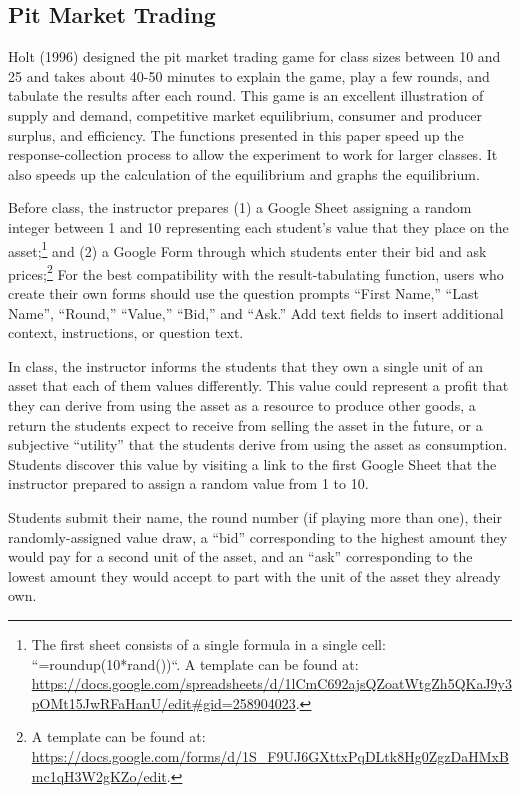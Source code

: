 \documentclass[
]{article}
\begin{document}
\hypertarget{pit-market-trading}{%
\subsection{Pit Market Trading}\label{pit-market-trading}}

Holt (1996) designed the pit market trading game for class sizes between
10 and 25 and takes about 40-50 minutes to explain the game, play a few
rounds, and tabulate the results after each round. This game is an
excellent illustration of supply and demand, competitive market
equilibrium, consumer and producer surplus, and efficiency. The
functions presented in this paper speed up the response-collection
process to allow the experiment to work for larger classes. It also
speeds up the calculation of the equilibrium and graphs the equilibrium.

Before class, the instructor prepares (1) a Google Sheet assigning a
random integer between 1 and 10 representing each student's value that
they place on the asset;\footnote{The first sheet consists of a single
  formula in a single cell: ``=roundup(10*rand())``. A template can be
  found at:\\
  \url{https://docs.google.com/spreadsheets/d/1lCmC692ajsQZoatWtgZh5QKaJ9y3pOMt15JwRFaHanU/edit\#gid=258904023}.}
and (2) a Google Form through which students enter their bid and ask
prices;\footnote{A template can be found at:\\
  \url{https://docs.google.com/forms/d/1S_F9UJ6GXttxPqDLtk8Hg0ZgzDaHMxBmc1qH3W2gKZo/edit}.}
For the best compatibility with the result-tabulating function, users
who create their own forms should use the question prompts ``First
Name,'' ``Last Name'', ``Round,'' ``Value,'' ``Bid,'' and ``Ask.'' Add
text fields to insert additional context, instructions, or question
text.

In class, the instructor informs the students that they own a single
unit of an asset that each of them values differently. This value could
represent a profit that they can derive from using the asset as a
resource to produce other goods, a return the students expect to receive
from selling the asset in the future, or a subjective ``utility'' that
the students derive from using the asset as consumption. Students
discover this value by visiting a link to the first Google Sheet that
the instructor prepared to assign a random value from 1 to 10.

Students submit their name, the round number (if playing more than one),
their randomly-assigned value draw, a ``bid'' corresponding to the
highest amount they would pay for a second unit of the asset, and an
``ask'' corresponding to the lowest amount they would accept to part
with the unit of the asset they already own.
\end{document}
